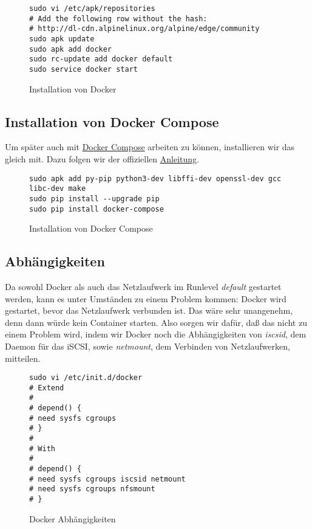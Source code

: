 \documentclass[12pt,a4paper,ngerman]{article}
\newcommand{\code}[1]{\textit{#1}}
\newcommand{\jpacaption}[1]{\caption{#1}\label{fig:#1}}
\begin{document}
\begin{figure}[H]
    \begin{lstlisting}
sudo vi /etc/apk/repositories
# Add the following row without the hash:
# http://dl-cdn.alpinelinux.org/alpine/edge/community
sudo apk update
sudo apk add docker
sudo rc-update add docker default
sudo service docker start
    \end{lstlisting}
    \jpacaption{Installation von Docker}
\end{figure}

\subsection{Installation von Docker Compose}
Um später auch mit \href{https://docs.docker.com/compose/}{Docker Compose}
arbeiten zu können, installieren wir das gleich mit. Dazu folgen wir der
offiziellen \href{https://docs.docker.com/compose/install/}{Anleitung}.

\begin{figure}[H]
    \begin{lstlisting}
sudo apk add py-pip python3-dev libffi-dev openssl-dev gcc libc-dev make
sudo pip install --upgrade pip
sudo pip install docker-compose
    \end{lstlisting}
    \jpacaption{Installation von Docker Compose}
\end{figure}

\subsection{Abhängigkeiten}
Da sowohl Docker als auch das Netzlaufwerk im Runlevel \code{default} gestartet
werden, kann es unter Umständen zu einem Problem kommen: Docker wird gestartet,
bevor das Netzlaufwerk verbunden ist. Das wäre sehr unangenehm, denn dann würde
kein Container starten. Also sorgen wir dafür, daß das nicht zu einem Problem
wird, indem wir Docker noch die Abhängigkeiten von \code{iscsid}, dem Daemon
für das iSCSI, sowie \code{netmount}, dem Verbinden von Netzlaufwerken,
mitteilen.

\begin{figure}[H]
    \begin{lstlisting}
sudo vi /etc/init.d/docker
# Extend
#
# depend() {
# need sysfs cgroups
# }
#
# With
#
# depend() {
# need sysfs cgroups iscsid netmount
# need sysfs cgroups nfsmount
# }
\end{lstlisting}
    \jpacaption{Docker Abhängigkeiten}
\end{figure}
\end{document}
